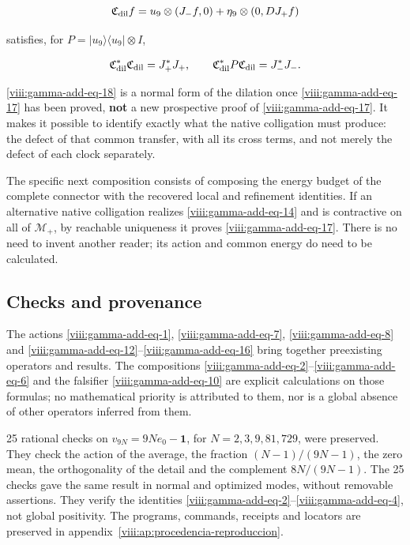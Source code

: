 \begin{equation}
\mathfrak C_{\rm dil}f
=u_9\otimes(J_-f,0)+\eta_9\otimes(0,DJ_+f)
\label{viii:gamma-add-eq-18}
\end{equation}

satisfies, for \(P=|u_9\rangle\langle u_9|\otimes I\),

\begin{equation}
\mathfrak C_{\rm dil}^*\mathfrak C_{\rm dil}=J_+^*J_+,\qquad
\mathfrak C_{\rm dil}^*P\mathfrak C_{\rm dil}=J_-^*J_-.
\label{viii:gamma-add-display-37}
\end{equation}

\eqref{viii:gamma-add-eq-18} is a normal form of the dilation once \eqref{viii:gamma-add-eq-17} has been proved, \textbf{not} a new prospective proof of \eqref{viii:gamma-add-eq-17}. It makes it possible to identify exactly what the native colligation must produce: the defect of that common transfer, with all its cross terms, and not merely the defect of each clock separately.

The specific next composition consists of composing the energy budget of the complete connector with the recovered local and refinement identities. If an alternative native colligation realizes \eqref{viii:gamma-add-eq-14} and is contractive on all of \(\mathcal M_+\), by reachable uniqueness it proves \eqref{viii:gamma-add-eq-17}. There is no need to invent another reader; its action and common energy do need to be calculated.

\subsection{Checks and provenance}
\label{viii:gamma-add-sub-412}

The actions \eqref{viii:gamma-add-eq-1}, \eqref{viii:gamma-add-eq-7},
\eqref{viii:gamma-add-eq-8} and \eqref{viii:gamma-add-eq-12}--\eqref{viii:gamma-add-eq-16}
bring together preexisting operators and results. The compositions
\eqref{viii:gamma-add-eq-2}--\eqref{viii:gamma-add-eq-6} and the falsifier
\eqref{viii:gamma-add-eq-10} are explicit calculations on those formulas;
no mathematical priority is attributed to them, nor is a global
absence of other operators inferred from them.

25 rational checks on
\(v_{9N}=9Ne_0-\mathbf1\), for \(N=2,3,9,81,729\), were preserved.
They check the action of the average, the fraction \((N-1)/(9N-1)\),
the zero mean, the orthogonality of the detail and the complement
\(8N/(9N-1)\). The 25 checks gave the same result in normal
and optimized modes, without removable assertions. They verify the identities
\eqref{viii:gamma-add-eq-2}--\eqref{viii:gamma-add-eq-4}, not global positivity.
The programs, commands, receipts and locators are preserved in
appendix~\ref{viii:ap:procedencia-reproduccion}.


